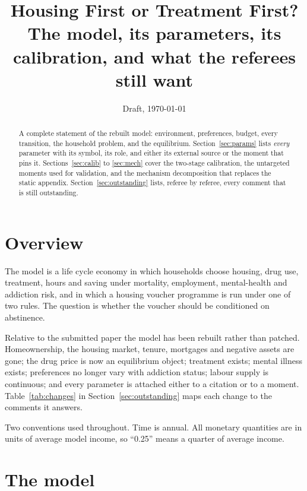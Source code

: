 \documentclass[11pt]{article}
\title{\textbf{Housing First or Treatment First?}\\[0.4em]
\large The model, its parameters, its calibration, and what the referees still want}
\author{}
\date{Draft, \today}
\begin{document}
\maketitle

\begin{abstract}
\noindent A complete statement of the rebuilt model: environment, preferences,
budget, every transition, the household problem, and the equilibrium.
Section~\ref{sec:params} lists \emph{every} parameter with its symbol, its role,
and either its external source or the moment that pins it.
Sections~\ref{sec:calib} to \ref{sec:mech} cover the two-stage calibration, the
untargeted moments used for validation, and the mechanism decomposition that
replaces the static appendix. Section~\ref{sec:outstanding} lists, referee by
referee, every comment that is still outstanding.
\end{abstract}

\newpage

\section{Overview}

The model is a life cycle economy in which households choose housing, drug use,
treatment, hours and saving under mortality, employment, mental-health and
addiction risk, and in which a housing voucher programme is run under one of two
rules. The question is whether the voucher should be conditioned on abstinence.

Relative to the submitted paper the model has been rebuilt rather than patched.
Homeownership, the housing market, tenure, mortgages and negative assets are
gone; the drug price is now an equilibrium object; treatment exists; mental
illness exists; preferences no longer vary with addiction status; labour supply
is continuous; and every parameter is attached either to a citation or to a
moment. Table~\ref{tab:changes} in Section~\ref{sec:outstanding} maps each change
to the comments it answers.

Two conventions used throughout. Time is annual. All monetary quantities are in
units of average model income, so ``0.25'' means a quarter of average income.

\section{The model}
\end{document}

